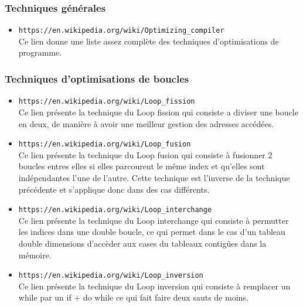 \documentclass[a4paper]{article}
\begin{document}
\subsubsection{Techniques générales}
\begin{itemize}
\item \texttt{https://en.wikipedia.org/wiki/Optimizing\_compiler} \\
Ce lien donne une liste assez complète des techniques d'optimisations de programme.\\
     \end{itemize}

\subsubsection{Techniques d'optimisations de boucles}
\begin{itemize}
\item \texttt{https://en.wikipedia.org/wiki/Loop\_fission} \\
Ce lien présente la technique du Loop fission qui consiste a diviser une boucle en deux, de manière à avoir une meilleur gestion des adresses accédées.\\

\item \texttt{https://en.wikipedia.org/wiki/Loop\_fusion} \\
Ce lien présente la technique du Loop fusion qui consiste à fusionner 2 boucles entres elles si elles parcourent le même index et qu'elles sont indépendantes l'une de l'autre. Cette technique est l'inverse de la technique précédente et s'applique donc dans des cas différents.\\

\item \texttt{https://en.wikipedia.org/wiki/Loop\_interchange} \\
Ce lien présente la technique du Loop interchange qui consiste à permutter les indices dans une double boucle, ce qui permet dans le cas d'un tableau double dimensions d'accèder aux cases du tableaux contigües dans la mémoire.\\

\item \texttt{https://en.wikipedia.org/wiki/Loop\_inversion} \\
Ce lien présente la technique du Loop inversion qui consiste à remplacer un while par un if + do while ce qui fait faire deux sauts de moins.\\
 

\end{itemize}
\end{document}
